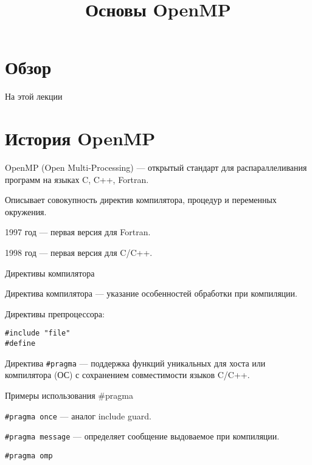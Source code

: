 

\title{Основы OpenMP}



\section*{Обзор}

\begin{frame}
\titlepage
\end{frame}

\begin{frame}{На этой лекции}
\tableofcontents
\end{frame}


\section{История OpenMP}

\begin{frame}

OpenMP (Open Multi-Processing) --- открытый стандарт для распараллеливания программ на языках C, C++, Fortran.

Описывает совокупность директив компилятора, процедур и переменных окружения.

1997 год --- первая версия для Fortran.

1998 год --- первая версия для C/C++.

\end{frame}

\begin{frame}[fragile]{Директивы компилятора}

Директива компилятора --- указание особенностей обработки при компиляции.

Директивы препроцессора:

\begin{lstlisting}
#include "file"
#define
\end{lstlisting}

Директива \texttt{\#pragma} --- поддержка функций уникальных для хоста или компилятора (ОС) с сохранением совместимости языков C/C++.

\end{frame}

\begin{frame}{Примеры использования \#pragma}

\texttt{\#pragma once} --- аналог include guard.

\texttt{\#pragma message} --- определяет сообщение выдоваемое при компиляции.

\texttt{\#pragma omp}

\end{frame}

